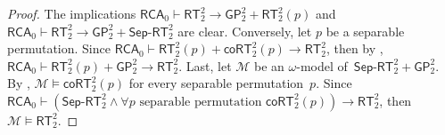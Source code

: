 \documentclass{article}
\numberwithin{theorem}{section}
\newtheorem{corollary}[theorem]{Corollary}
\def\M{\mathcal{M}}
\newcommand{\RCA}[0]{\mathsf{RCA}}
\newcommand{\RT}[0]{\mathsf{RT}}
\newcommand{\GP}{\mathsf{GP}}
\newcommand{\SGP}{\mathsf{SGP}}
\newcommand{\coRT}[0]{\mathsf{coRT}}
\newcommand{\SepRT}[0]{\mathsf{Sep}\mbox{-}\mathsf{RT}}
\newcommand{\NN}[0]{\mathbb{N}}
\begin{document}

\begin{proof}
The implications $\RCA_0 \vdash \RT^2_2 \rightarrow \GP_2^2 + \RT_2^2(p)$ and $\RCA_0 \vdash \RT^2_2 \rightarrow \GP_2^2 + \SepRT_2^2$ are clear.
Conversely, let $p$ be a separable permutation. Since $\RCA_0 \vdash \RT^2_2(p) + \coRT^2_2(p) \rightarrow \RT^2_2$, then by , $\RCA_0 \vdash \RT^2_2(p) + \GP^2_2 \rightarrow \RT^2_2$.
Last, let $\M$ be an $\omega$-model of~$\SepRT^2_2 + \GP^2_2$. By , $\M \models \coRT^2_2(p)$ for every separable permutation~$p$. Since $\RCA_0 \vdash (\SepRT^2_2 \wedge \forall p \mbox{ separable permutation } \coRT^2_2(p)) \to \RT^2_2$, then $\M \models \RT^2_2$.








\end{proof}
\end{document}
